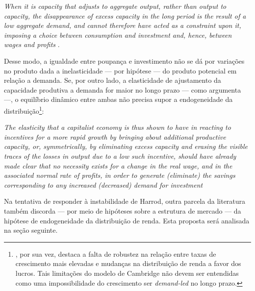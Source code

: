 \begin{citacao}
\textit{When it is
capacity that adjusts to aggregate output, rather than output to
capacity, the disappearance of excess capacity in the long period is
the result of a low aggregate demand, and cannot therefore have
acted as a constraint upon it, imposing a choice between consumption
and investment and, hence, between wages and profits} \cite[p.~50]{halevi_notes_2014}.
\end{citacao}
Desse modo, a igualdade entre poupança e investimento não se dá por variações no produto dada a inelasticidade --- por hipótese --- do produto potencial em relação a demanda.
Se, por outro lado, a elasticidade de ajustamento da capacidade produtiva a demanda for maior no longo prazo --- como argumenta \textcite[p.~62--3]{halevi_notes_2014} ---, o equilíbrio dinâmico entre ambas não precisa supor a endogeneidade da distribuição\footnote{\textcite[p.~158]{cesaratto_neo-kaleckian_2015}, por sua vez, destaca a falta de robustez na relação entre taxas de crescimento mais elevadas e mudanças na distribuição de renda a favor dos lucros.
	Tais limitações do modelo de Cambridge não devem ser entendidas como uma impossibilidade do crescimento ser \textit{demand-led} no longo prazo.}:

\begin{citacao}
	\textit{The elasticity that a capitalist economy is thus shown to have in
	reacting to incentives for a more rapid growth by bringing about
	additional productive capacity, or, symmetrically, by eliminating
	excess capacity and erasing the visible traces of the losses in output
	due to a low such incentive, should have already made clear that no
	necessity exists for a change in the real wage, and in the associated
	normal rate of profits, in order to generate (eliminate) the savings
	corresponding to any increased (decreased) demand for investment} \cite[p.~53]{halevi_notes_2014}
\end{citacao}
Na tentativa de responder à instabilidade de Harrod, outra parcela da literatura também discorda --- por meio de hipóteses sobre a estrutura de mercado --- da hipótese de endogeneidade da distribuição de renda.
Esta proposta será analisada na seção seguinte.

